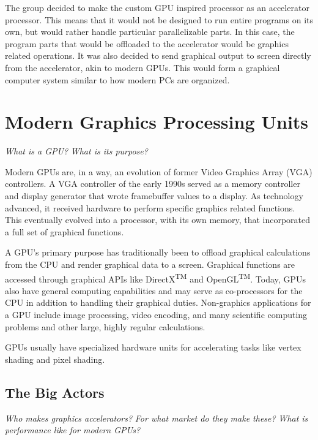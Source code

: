 \documentclass[../main/report.tex]{subfiles}
\begin{document}
The group decided to make the custom GPU inspired processor as an accelerator processor.
This means that it would not be designed to run entire programs on its own, but would rather handle particular parallelizable parts.
In this case, the program parts that would be offloaded to the accelerator would be graphics related operations.
It was also decided to send graphical output to screen directly from the accelerator, akin to modern GPUs.
This would form a graphical computer system similar to how modern PCs are organized.

\section{Modern Graphics Processing Units}

\textit{What is a GPU?}
\textit{What is its purpose?}


Modern GPUs are, in a way, an evolution of former Video Graphics Array (VGA) controllers.
A VGA controller of the early 1990s served as a memory controller and display generator that wrote framebuffer values to a display.
As technology advanced, it received hardware to perform specific graphics related functions.
This eventually evolved into a processor, with its own memory, that incorporated a full set of graphical functions.

A GPU's primary purpose has traditionally been to offload graphical calculations from the CPU and render graphical data to a screen.
Graphical functions are accessed through graphical APIs like DirectX\textsuperscript{TM} and OpenGL\textsuperscript{TM}.
Today, GPUs also have general computing capabilities and may serve as co-processors for the CPU in addition to handling their graphical duties.
Non-graphics applications for a GPU include image processing, video encoding, and many scientific computing problems and other large, highly regular calculations.

GPUs usually have specialized hardware units for accelerating tasks like vertex shading and pixel shading.

\subsection{The Big Actors}

\textit{Who makes graphics accelerators?}
\textit{For what market do they make these?}
\textit{What is performance like for modern GPUs?}
\end{document}

